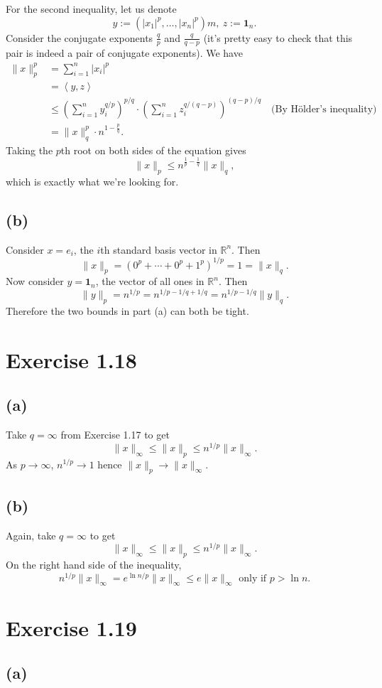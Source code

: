 For the second inequality, let us denote 
\[ y := (|x_1|^p, \dots, |x_n|^p)m, \ z := \mathbf{1}_{n}. \]
Consider the conjugate exponents $\frac{q}{p}$ and $\frac{q}{q - p}$ (it's pretty easy to check that this 
pair is indeed a pair of conjugate exponents). We have
\begin{align*}
	\lVert x \rVert_{p}^p 
	&= \sum_{i = 1}^{n} |x_i|^p \\
	&= \left\langle y, z \right\rangle \\
	&\leq \left( \sum_{i = 1}^{n} y_i^{q/p} \right)^{p/q} \cdot 
	\left( \sum_{i = 1}^{n} z_i^{q / (q - p)} \right)^{(q - p)/q} \quad \text{(By Hölder's inequality)} \\
	&= \lVert x \rVert_{q}^p \cdot n^{1 - \frac{p}{q}}.
\end{align*}
Taking the $p$th root on both sides of the equation gives 
\[ \lVert x \rVert_{p} \leq n^{\frac{1}{p} - \frac{1}{q}} \lVert x \rVert_{q}, \]
which is exactly what we're looking for.

\subsection*{(b)}
Consider $x = e_i$, the $i$th standard basis vector in $\mathbb{R}^n$. Then 
\[ \lVert x \rVert_{p} = (0^p + \cdots + 0^p + 1^p)^{1/p} = 1 = \lVert x \rVert_{q}. \]
Now consider $y = \mathbf{1}_n$, the vector of all ones in $\mathbb{R}^n$. Then 
\[ \lVert y \rVert_{p} = n^{1/p} = n^{1/p-1/q+1/q} = n^{1/p-1/q}\lVert y \rVert_{q}. \]
Therefore the two bounds in part (a) can both be tight.


\newpage
\section*{Exercise 1.18}
\subsection*{(a)}
Take $q = \infty$ from Exercise 1.17 to get 
\[ \lVert x \rVert_{\infty} \leq \lVert x \rVert_{p} \leq n^{1/p} \lVert x \rVert_{\infty}. \]
As $p \to \infty$, $n^{1/p} \to 1$ hence $\lVert x \rVert_{p} \to \lVert x \rVert_{\infty}$.

\subsection*{(b)}
Again, take $q = \infty$ to get 
\[ \lVert x \rVert_{\infty} \leq \lVert x \rVert_{p} \leq n^{1/p} \lVert x \rVert_{\infty}. \]
On the right hand side of the inequality, 
\[ n^{1/p} \lVert x \rVert_{\infty} = e^{\ln{n}/p} \lVert x \rVert_{\infty} \leq 
e \lVert x \rVert_{\infty} \text { only if } p > \ln{n}. \]


\newpage
\section*{Exercise 1.19}
\subsection*{(a)}

